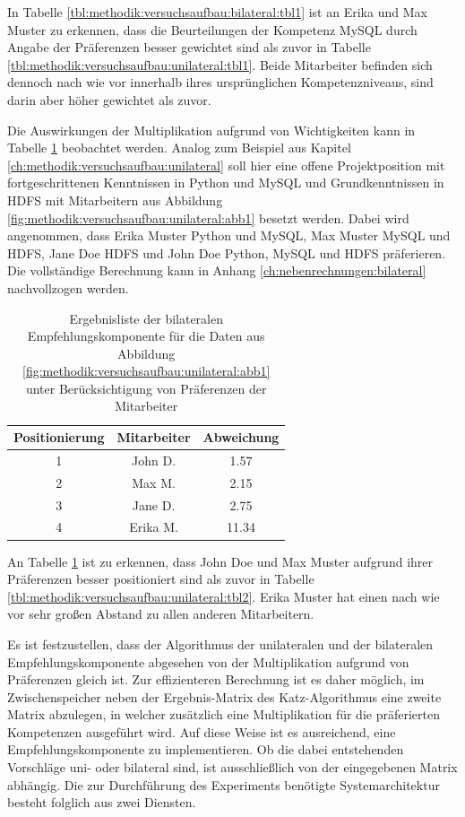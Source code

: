 In Tabelle \ref{tbl:methodik:versuchsaufbau:bilateral:tbl1} ist an Erika und Max Muster zu erkennen, dass die Beurteilungen der Kompetenz MySQL durch Angabe der Präferenzen besser gewichtet sind als zuvor in Tabelle \ref{tbl:methodik:versuchsaufbau:unilateral:tbl1}. Beide Mitarbeiter befinden sich dennoch nach wie vor innerhalb ihres ursprünglichen Kompetenzniveaus, sind darin aber höher gewichtet als zuvor.

Die Auswirkungen der Multiplikation aufgrund von Wichtigkeiten kann in Tabelle \ref{tbl:methodik:versuchsaufbau:bilateral:tbl2} beobachtet werden. Analog zum Beispiel aus Kapitel \ref{ch:methodik:versuchsaufbau:unilateral} soll hier eine offene Projektposition mit fortgeschrittenen Kenntnissen in Python und MySQL und Grundkenntnissen in HDFS mit Mitarbeitern aus Abbildung \ref{fig:methodik:versuchsaufbau:unilateral:abb1} besetzt werden. Dabei wird angenommen, dass Erika Muster Python und MySQL, Max Muster MySQL und HDFS, Jane Doe HDFS und John Doe Python, MySQL und HDFS präferieren. Die vollständige Berechnung kann in Anhang \ref{ch:nebenrechnungen:bilateral} nachvollzogen werden.

\begin{table}[h]
	\centering
	\begin{tabular}{c|c|c}
		Positionierung & Mitarbeiter & Abweichung\\
		\hline
		1 & John D.  & 1.57\\
		2 & Max M.   & 2.15\\
		3 & Jane D.  & 2.75\\
		4 & Erika M. & 11.34
	\end{tabular}
	\caption{Ergebnisliste der bilateralen Empfehlungskomponente für die Daten aus Abbildung \ref{fig:methodik:versuchsaufbau:unilateral:abb1} unter Berücksichtigung von Präferenzen der Mitarbeiter}
	\label{tbl:methodik:versuchsaufbau:bilateral:tbl2}
\end{table}

An Tabelle \ref{tbl:methodik:versuchsaufbau:bilateral:tbl2} ist zu erkennen, dass John Doe und Max Muster aufgrund ihrer Präferenzen besser positioniert sind als zuvor in Tabelle \ref{tbl:methodik:versuchsaufbau:unilateral:tbl2}. Erika Muster hat einen nach wie vor sehr großen Abstand zu allen anderen Mitarbeitern.

Es ist festzustellen, dass der Algorithmus der unilateralen und der bilateralen Empfehlungskomponente abgesehen von der Multiplikation aufgrund von Präferenzen gleich ist. Zur effizienteren Berechnung ist es daher möglich, im Zwischenspeicher neben der Ergebnis-Matrix des Katz-Algorithmus eine zweite Matrix abzulegen, in welcher zusätzlich eine Multiplikation für die präferierten Kompetenzen ausgeführt wird. Auf diese Weise ist es ausreichend, eine Empfehlungskomponente zu implementieren. Ob die dabei entstehenden Vorschläge uni- oder bilateral sind, ist ausschließlich von der eingegebenen Matrix abhängig. Die zur Durchführung des Experiments benötigte Systemarchitektur besteht folglich aus zwei Diensten.

